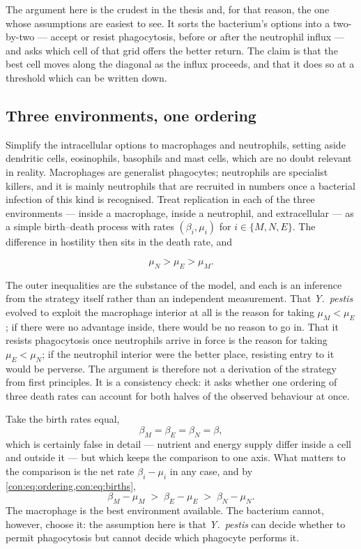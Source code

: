 \documentclass[11pt,a4paper]{report}
\newcommand{\yp}{\textit{Y.~pestis}}
\theoremstyle{plain}
\theoremstyle{remark}
\begin{document}
The argument here is the crudest in the thesis and, for that reason, the one
whose assumptions are easiest to see. It sorts the bacterium's options into a
two-by-two --- accept or resist phagocytosis, before or after the neutrophil
influx --- and asks which cell of that grid offers the better return. The
claim is that the best cell moves along the diagonal as the influx proceeds,
and that it does so at a threshold which can be written down.

\subsection{Three environments, one ordering}
\label{con:sec:quadrant-ordering}

Simplify the intracellular options to macrophages and neutrophils, setting
aside dendritic cells, eosinophils, basophils and mast cells, which are no
doubt relevant in reality. Macrophages are generalist phagocytes; neutrophils
are specialist killers, and it is mainly neutrophils that are recruited in
numbers once a bacterial infection of this kind is recognised. Treat
replication in each of the three environments --- inside a macrophage, inside
a neutrophil, and extracellular --- as a simple birth--death process with
rates $(\beta_i,\mu_i)$ for $i\in\{M,N,E\}$. The difference in hostility then
sits in the death rate, and

\begin{equation}
\mu_N>\mu_E>\mu_M .
\label{con:eq:ordering}
\end{equation}

The outer inequalities are the substance of the model, and each is an
inference from the strategy itself rather than an independent measurement.
That \yp{} evolved to exploit the macrophage interior at all is the reason
for taking $\mu_M<\mu_E$; if there were no advantage inside, there would be
no reason to go in. That it resists phagocytosis once neutrophils arrive in
force is the reason for taking $\mu_E<\mu_N$; if the neutrophil interior were
the better place, resisting entry to it would be perverse. The argument is
therefore not a derivation of the strategy from first principles. It is a
consistency check: it asks whether one ordering of three death rates can
account for both halves of the observed behaviour at once.

Take the birth rates equal,
\begin{equation}
\beta_M=\beta_E=\beta_N=\beta ,
\label{con:eq:births}
\end{equation}
which is certainly false in detail --- nutrient and energy supply differ
inside a cell and outside it --- but which keeps the comparison to one axis.
What matters to the comparison is the net rate $\beta_i-\mu_i$ in any case,
and by \cref{con:eq:ordering,con:eq:births},
\begin{equation}
\beta_M-\mu_M \;>\; \beta_E-\mu_E \;>\; \beta_N-\mu_N .
\label{con:eq:netordering}
\end{equation}
The macrophage is the best environment available. The bacterium cannot,
however, choose it: the assumption here is that \yp{} can decide whether to
permit phagocytosis but cannot decide which phagocyte performs it.
\end{document}
